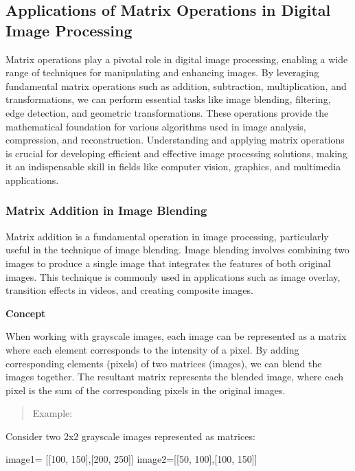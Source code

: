 \documentclass[
  letterpaper,
  DIV=11,
  numbers=noendperiod]{scrreprt}
\newenvironment{Shaded}{\begin{snugshade}}{\end{snugshade}}
\newcommand{\DecValTok}[1]{\textcolor[rgb]{0.68,0.00,0.00}{#1}}
\newcommand{\NormalTok}[1]{\textcolor[rgb]{0.00,0.23,0.31}{#1}}
\newcommand{\OperatorTok}[1]{\textcolor[rgb]{0.37,0.37,0.37}{#1}}
\theoremstyle{plain}
\theoremstyle{definition}
\theoremstyle{remark}
\begin{document}
\subsection{Applications of Matrix Operations in Digital Image
Processing}\label{applications-of-matrix-operations-in-digital-image-processing}

Matrix operations play a pivotal role in digital image processing,
enabling a wide range of techniques for manipulating and enhancing
images. By leveraging fundamental matrix operations such as addition,
subtraction, multiplication, and transformations, we can perform
essential tasks like image blending, filtering, edge detection, and
geometric transformations. These operations provide the mathematical
foundation for various algorithms used in image analysis, compression,
and reconstruction. Understanding and applying matrix operations is
crucial for developing efficient and effective image processing
solutions, making it an indispensable skill in fields like computer
vision, graphics, and multimedia applications.

\subsubsection{Matrix Addition in Image
Blending}\label{matrix-addition-in-image-blending}

Matrix addition is a fundamental operation in image processing,
particularly useful in the technique of image blending. Image blending
involves combining two images to produce a single image that integrates
the features of both original images. This technique is commonly used in
applications such as image overlay, transition effects in videos, and
creating composite images.

\textbf{Concept}

When working with grayscale images, each image can be represented as a
matrix where each element corresponds to the intensity of a pixel. By
adding corresponding elements (pixels) of two matrices (images), we can
blend the images together. The resultant matrix represents the blended
image, where each pixel is the sum of the corresponding pixels in the
original images.

\begin{quote}
Example:
\end{quote}

Consider two 2x2 grayscale images represented as matrices:

\begin{Shaded}
\begin{Highlighting}[]
\NormalTok{image1}\OperatorTok{=}\NormalTok{ [[}\DecValTok{100}\NormalTok{, }\DecValTok{150}\NormalTok{],[}\DecValTok{200}\NormalTok{, }\DecValTok{250}\NormalTok{]]}
\NormalTok{image2}\OperatorTok{=}\NormalTok{[[}\DecValTok{50}\NormalTok{, }\DecValTok{100}\NormalTok{],[}\DecValTok{100}\NormalTok{, }\DecValTok{150}\NormalTok{]]}
\end{Highlighting}
\end{Shaded}
\end{document}
